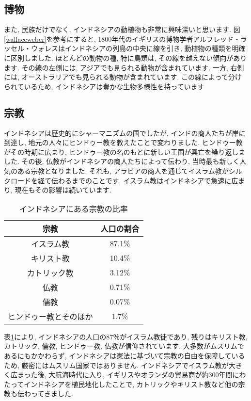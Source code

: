 \documentclass[a4j, twocolumn]{jarticle}
\begin{document}
  \subsection{博物}
  また, 民族だけでなく, インドネシアの動植物も非常に興味深いと思います. 図\ref{wallaceweber}を参考にすると, 1800年代のイギリスの博物学者アルフレッド・ラッセル・ウォレスはインドネシアの列島の中央に線を引き, 動植物の種類を明確に区別しました. ほとんどの動物の種, 特に鳥類は, その線を越えない傾向があります. その線の左側には, アジアでも見られる動物が含まれています. 一方, 右側には, オーストラリアでも見られる動物が含まれています. この線によって分けられているため, インドネシアは豊かな生物多様性を持っています\cite{wallaceline}
  \subsection{宗教}
  インドネシアは歴史的にシャーマニズムの国でしたが, インドの商人たちが岸に到達し, 地元の人々にヒンドゥー教を教えたことで変わりました. ヒンドゥー教がその時期に広まり, ヒンドゥー教の名のもとに新しい王国が興亡を繰り返しました. その後, 仏教がインドネシアの商人たちによって伝わり, 当時最も新しく人気のある宗教となりました. それも, アラビアの商人を通じてイスラム教がシルクロードを経て伝わるまでのことです. イスラム教はインドネシアで急速に広まり, 現在もその影響は続いています\cite{philtar_indonesian_religions}.\\
  \begin{table}[htb]
    \caption{インドネシアにある宗教の比率}\label{religion-percentage}
    \centering
    \begin{tabular}{|c|c|}
      \hline
      宗教 & 人口の割合 \\
      \hline
      イスラム教 & 87.1\% \\
      \hline
      キリスト教 & 10.4\% \\
      \hline
      カトリック教 & 3.12\% \\
      \hline
      仏教 & 0.71\% \\
      \hline
      儒教 & 0.07\% \\
      \hline
      ヒンドゥー教とそのほか & 1.7\% \\
      \hline
    \end{tabular}
  \end{table}
  表\ref{religion-percentage}により, インドネシアの人口の87％がイスラム教徒であり\cite{pew2024indonesia}, 残りはキリスト教, カトリック, 儒教, ヒンドゥー教, 仏教が信仰されています\cite{penpres1965}. 大多数がムスリムであるにもかかわらず, インドネシアは憲法に基づいて宗教の自由を保障しているため, 厳密にはムスリム国家ではありません. インドネシアでイスラム教が大きく広まった後, 大航海時代に入り, イギリスやオランダの貿易商が約300年間にわたってインドネシアを植民地化したことで, カトリックやキリスト教など他の宗教も伝わってきました\cite{philtar_indonesian_religions}.
\end{document}
